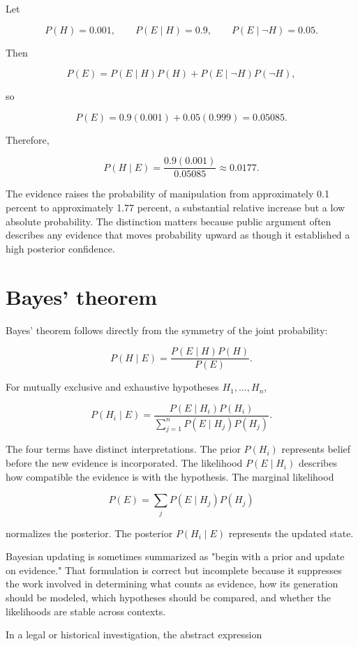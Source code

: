 Let

\[
P(H)=0.001,\qquad
P(E\mid H)=0.9,\qquad
P(E\mid\neg H)=0.05.
\]

Then

\[
P(E)
=
P(E\mid H)P(H)
+
P(E\mid\neg H)P(\neg H),
\]

so

\[
P(E)
=
0.9(0.001)+0.05(0.999)
=
0.05085.
\]

Therefore,

\[
P(H\mid E)
=
\frac{0.9(0.001)}{0.05085}
\approx 0.0177.
\]

The evidence raises the probability of manipulation from approximately 0.1 percent to approximately 1.77 percent, a substantial relative increase but a low absolute probability. The distinction matters because public argument often describes any evidence that moves probability upward as though it established a high posterior confidence.

\section{Bayes' theorem}
\label{sec:a5}

Bayes' theorem follows directly from the symmetry of the joint probability:

\[
P(H\mid E)
=
\frac{P(E\mid H)P(H)}{P(E)}.
\]

For mutually exclusive and exhaustive hypotheses \(H_1,\ldots,H_n\),

\[
P(H_i\mid E)
=
\frac{P(E\mid H_i)P(H_i)}
{\sum_{j=1}^{n}P(E\mid H_j)P(H_j)}.
\]

The four terms have distinct interpretations. The prior \(P(H_i)\) represents belief before the new evidence is incorporated. The likelihood \(P(E\mid H_i)\) describes how compatible the evidence is with the hypothesis. The marginal likelihood

\[
P(E)
=
\sum_jP(E\mid H_j)P(H_j)
\]

normalizes the posterior. The posterior \(P(H_i\mid E)\) represents the updated state.

Bayesian updating is sometimes summarized as "begin with a prior and update on evidence." That formulation is correct but incomplete because it suppresses the work involved in determining what counts as evidence, how its generation should be modeled, which hypotheses should be compared, and whether the likelihoods are stable across contexts.

In a legal or historical investigation, the abstract expression

